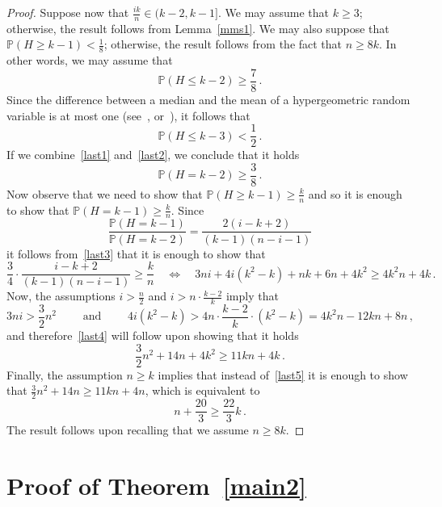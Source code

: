 \documentclass[10pt]{article}
\theoremstyle{plain}
\theoremstyle{definition}
\theoremstyle{remark}
\begin{document}
\begin{proof}
Suppose now that $\frac{ik}{n}\in (k-2,k-1]$. 
We may assume that $k\ge 3$; otherwise, the result follows from Lemma~\ref{mms1}. 
We may also suppose that $\mathbb{P}(H\ge k-1)<\frac{1}{8}$; otherwise, the result follows from the fact that $n\ge 8k$. In other words, we may assume that 
\begin{equation}\label{last1}
\mathbb{P}(H \le k-2) \ge \frac{7}{8} \, .
\end{equation}
Since the difference between a median and the mean of a hypergeometric random variable is at most one (see~\cite{Uhlmann}, \cite{Siegel} or~\cite[Corollary~13]{cooper2009linearly}), it follows that  
\begin{equation}\label{last2}
\mathbb{P}(H \le k-3) < \frac{1}{2} \, .
\end{equation}
If we combine~\eqref{last1} and~\eqref{last2}, we conclude that it holds 
\begin{equation}\label{last3}
\mathbb{P}(H = k-2) \ge \frac{3}{8} \, .
\end{equation}
Now observe that we need to show that $\mathbb{P}(H\ge k-1)\ge \frac{k}{n}$ and so it is enough to show that  
$\mathbb{P}(H = k-1)\ge \frac{k}{n}$. 
Since 
\[
\frac{\mathbb{P}(H=k-1)}{\mathbb{P}(H=k-2)} = \frac{2(i-k+2)}{(k-1)(n-i-1)} 
\]
it follows from~\eqref{last3} that it is enough to show that 
\begin{equation}\label{last4}
\frac{3}{4}\cdot\frac{i-k+2}{(k-1)(n-i-1)} \ge \frac{k}{n} \quad \Longleftrightarrow\quad 3ni+4i(k^2-k) +nk+6n+4k^2 \ge 4k^2n+4k \, .
\end{equation}
Now, the assumptions $i> \frac{n}{2}$ and $i>n\cdot\frac{k-2}{k}$  
imply that 
\[
3ni > \frac{3}{2}n^2 \quad\quad\text{ and }\quad\quad 4i(k^2-k) > 4n\cdot\frac{k-2}{k}\cdot(k^2-k)= 4k^2n-12kn+8n \, ,
\] 
and  therefore~\eqref{last4} will follow upon showing that it holds  
\begin{equation}\label{last5}
 \frac{3}{2}n^2+14n+4k^2 \ge 11kn+4k \, .
\end{equation}
Finally,  the assumption $n\ge k$ implies that  instead of~\eqref{last5}  it is enough to show that 
$\frac{3}{2}n^2+14n \ge 11kn+4n$, which is equivalent to 
\[
n + \frac{20}{3} \ge \frac{22}{3} k \, .
\]
The result follows upon recalling  that we assume $n\ge 8k$. 
\end{proof}






\section{Proof of Theorem~\ref{main2}}
\label{main2_proof}
\end{document}
